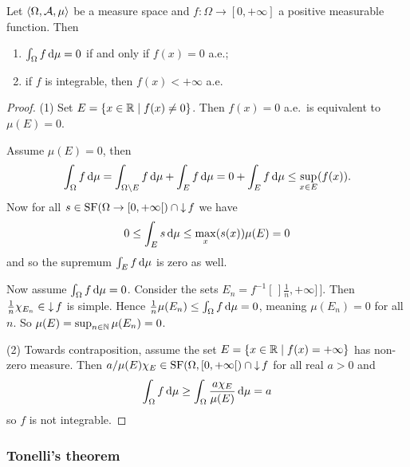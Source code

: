 \begin{proposition} \label{functionPropertiesFromIntegral}
Let $\left\langle \Omega, \mathcal{A}, \mu \right\rangle$ be a measure space and $f:\Omega\to[0,+\infty]$ a positive measurable function. Then
\begin{enumerate}
\item $\int_\Omega f\operatorname{d \!}{\mu} = 0$ \textup{if and only if} $f(x) = 0$ a.e.;
\item if $f$ is integrable, then $f(x)< +\infty$ a.e.\
\end{enumerate}
\end{proposition}
\begin{proof}(1) Set $E = \setbuilder{x\in\R}{f(x) \neq 0}$. Then $f(x) = 0$ a.e.\ is equivalent to $\mu(E) = 0$.

Assume $\mu(E) = 0$, then 
\[ \int_\Omega f\operatorname{d \!}{\mu} = \int_{\Omega\setminus E} f\operatorname{d \!}{\mu} + \int_E f\operatorname{d \!}{\mu} = 0+\int_E f\operatorname{d \!}{\mu} \leq \sup_{x\in E}(f(x)). \]
Now for all $s\in\SF(\Omega\to \interval[co]{0,+\infty})\cap \downset f$ we have
\[ 0\leq \int_E s \operatorname{d \!}{\mu}\leq \max_x(s(x))\mu(E) = 0  \]
and so the supremum $\int_E f\operatorname{d \!}{\mu}$ is zero as well.

Now assume $\int_\Omega f\operatorname{d \!}{\mu} = 0$. Consider the sets $E_n = f^{-1}[\,]\frac{1}{n},+\infty]\,]$. Then $\frac{1}{n}\chi_{E_n}\in \operatorname{\downarrow} f$ is simple. Hence $\frac{1}{n}\mu(E_n)\leq \int_\Omega f\operatorname{d \!}{\mu} = 0$, meaning $\mu(E_n) = 0$ for all $n$. So $\mu(E) = \sup_{n\in\mathbb{N}}\mu(E_n) = 0$.

(2) Towards contraposition, assume the set $E = \setbuilder{x\in\R}{f(x) = +\infty}$ has non-zero measure. Then $a/\mu(E)\chi_E\in\SF(\Omega, \interval[co]{0,+\infty})\cap \downset f$ for all real $a>0$ and
\[  \int_\Omega f\operatorname{d \!}{\mu} \geq \int_\Omega \frac{a\chi_E}{\mu(E)}\operatorname{d \!}{\mu} = a  \]
so $f$ is not integrable.
\end{proof}

\subsubsection{Tonelli's theorem}

